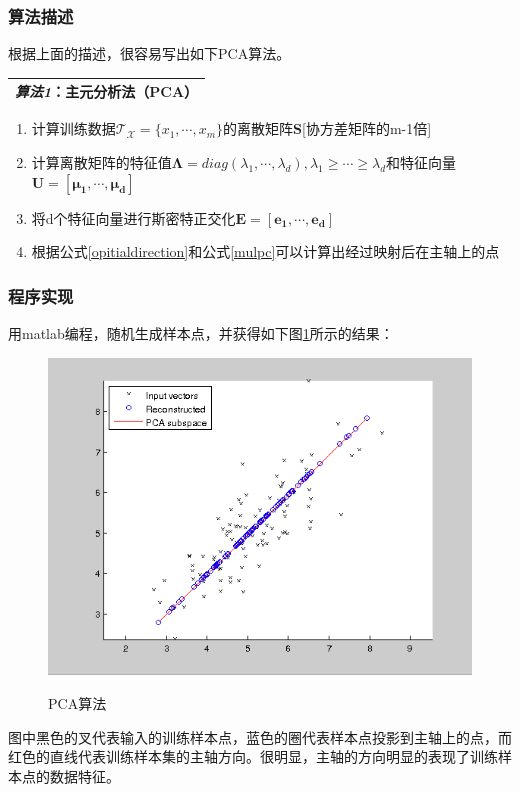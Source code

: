 \documentclass[10pt,a4paper]{article}
\begin{document}
\begin{CJK*}{UTF8}{song}
\subsubsection{算法描述}
根据上面的描述，很容易写出如下PCA算法。
\begin{table}[!htp]
\label{notation}
\center
\begin{tabular}{|L{0.9\textwidth}|}
\hline
\textit{算法1}：主元分析法（PCA） \\
\hline
\end{tabular}
\end{table}
\begin{enumerate}
\item 计算训练数据$\mathcal{T_X}=\{x_1,\cdots,x_m\}$的离散矩阵$\mathbf{S}$[协方差矩阵的m-1倍]
\item 计算离散矩阵的特征值$\mathbf{\Lambda}=diag(\lambda_1,\cdots,\lambda_d),\lambda_1\geqslant\cdots\geqslant\lambda_d$和特征向量$\mathbf{U}=[\boldsymbol{\mu_1},\cdots,\boldsymbol{\mu_{d}}]$
\item 将d个特征向量进行斯密特正交化$\mathbf{E}=[\boldsymbol{e_1},\cdots,\boldsymbol{e_{d}}]$
\item 根据公式\ref{opitialdirection}和公式\ref{mulpc}可以计算出经过映射后在主轴上的点
\end{enumerate}


\subsubsection{程序实现}
用matlab编程，随机生成样本点，并获得如下图\ref{fig:pca}所示的结果：
\begin{figure}[!htbp]
	\centering
	\caption{PCA算法}  
		\includegraphics[scale=0.55]{figs/pca.png}
    	\label{fig:pca}
\end{figure}
图中黑色的叉代表输入的训练样本点，蓝色的圈代表样本点投影到主轴上的点，而红色的直线代表训练样本集的主轴方向。很明显，主轴的方向明显的表现了训练样本点的数据特征。



\end{CJK*}
\end{document}
